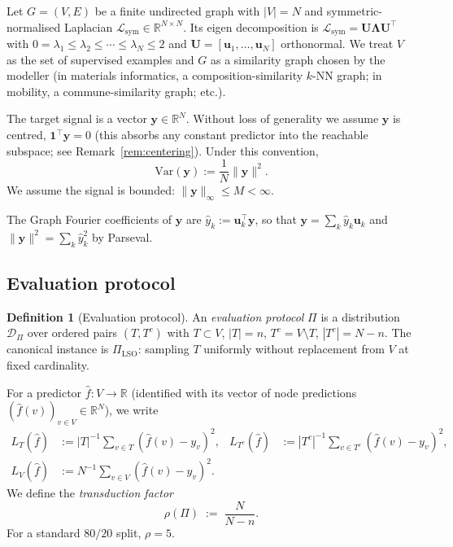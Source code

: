 \documentclass[11pt,a4paper]{article}
\theoremstyle{plain}
\theoremstyle{definition}
\newtheorem{definition}[theorem]{Definition}
\theoremstyle{remark}
\newcommand{\by}{\mathbf{y}}
\newcommand{\bU}{\mathbf{U}}
\newcommand{\bu}{\mathbf{u}}
\newcommand{\bone}{\mathbf{1}}
\newcommand{\R}{\mathbb{R}}
\newcommand{\Var}{\mathrm{Var}}
\newcommand{\Lsym}{\mathcal{L}_{\mathrm{sym}}}
\newcommand{\Dcal}{\mathcal{D}}
\begin{document}
Let $G = (V, E)$ be a finite undirected graph with $|V| = N$ and
symmetric-normalised Laplacian $\Lsym \in \R^{N \times N}$.  Its eigen
decomposition is $\Lsym = \bU \boldsymbol{\Lambda} \bU^\top$ with
$0 = \lambda_1 \leq \lambda_2 \leq \cdots \leq \lambda_N \leq 2$ and
$\bU = [\bu_1, \ldots, \bu_N]$ orthonormal.  We treat $V$ as the set
of supervised examples and $G$ as a similarity graph chosen by the
modeller (in materials informatics, a composition-similarity $k$-NN
graph; in mobility, a commune-similarity graph; etc.).

The target signal is a vector $\by \in \R^N$.  Without loss of generality
we assume $\by$ is centred, $\bone^\top \by = 0$ (this absorbs any
constant predictor into the reachable subspace; see
Remark~\ref{rem:centering}).  Under this convention,
\begin{equation}
    \Var(\by) := \frac{1}{N}\|\by\|^2.
    \label{eq:var-defn}
\end{equation}
We assume the signal is bounded: $\|\by\|_\infty \leq M < \infty$.

The Graph Fourier coefficients of $\by$ are $\hat y_k := \bu_k^\top \by$,
so that $\by = \sum_k \hat y_k \bu_k$ and $\|\by\|^2 = \sum_k \hat y_k^2$
by Parseval.

\subsection{Evaluation protocol}
\label{subsec:protocol}

\begin{definition}[Evaluation protocol]
\label{def:protocol}
An \emph{evaluation protocol} $\Pi$ is a distribution $\Dcal_\Pi$ over
ordered pairs $(T, T^c)$ with $T \subset V$, $|T| = n$, $T^c = V \setminus T$,
$|T^c| = N - n$.  The canonical instance is $\Pi_{\mathrm{LSO}}$:
sampling $T$ uniformly without replacement from $V$ at fixed cardinality.
\end{definition}

For a predictor $\hat f : V \to \R$ (identified with its vector of node
predictions $(\hat f(v))_{v \in V} \in \R^N$), we write
\begin{align}
    L_T(\hat f)    &:= |T|^{-1}    \sum_{v \in T}    (\hat f(v) - y_v)^2,
    & L_{T^c}(\hat f) &:= |T^c|^{-1} \sum_{v \in T^c} (\hat f(v) - y_v)^2,\\
    L_V(\hat f)    &:= N^{-1}      \sum_{v \in V}    (\hat f(v) - y_v)^2.
\end{align}
We define the \emph{transduction factor}
\begin{equation}
    \rho(\Pi) \;:=\; \frac{N}{N - n}.
    \label{eq:rho-defn}
\end{equation}
For a standard $80/20$ split, $\rho = 5$.
\end{document}
